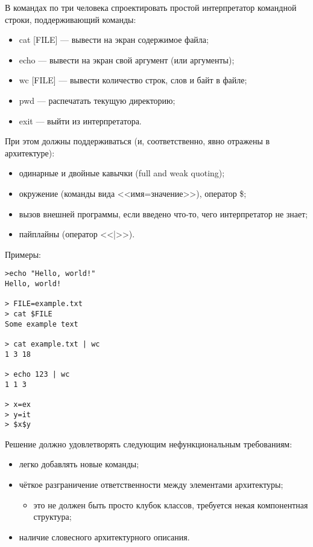 \documentclass[a5paper]{homework}
\begin{document}

В командах по три человека спроектировать простой интерпретатор командной строки, поддерживающий команды:

\begin{itemize}
    \item cat [FILE] --- вывести на экран содержимое файла;
    \item echo --- вывести на экран свой аргумент (или аргументы);
    \item wc [FILE] --- вывести количество строк, слов и байт в файле;
    \item pwd --- распечатать текущую директорию;
    \item exit --- выйти из интерпретатора.
\end{itemize}

При этом должны поддерживаться (и, соответственно, явно отражены в архитектуре):

\begin{itemize}
    \item одинарные и двойные кавычки (full and weak quoting);
    \item окружение (команды вида <<имя=значение>>), оператор \$;
    \item вызов внешней программы, если введено что-то, чего интерпретатор не знает;
    \item пайплайны (оператор <<|>>).
\end{itemize}

Примеры:
\begin{verbatim}
>echo "Hello, world!"
Hello, world!

> FILE=example.txt
> cat $FILE
Some example text

> cat example.txt | wc
1 3 18

> echo 123 | wc
1 1 3

> x=ex
> y=it
> $x$y
\end{verbatim}

Решение должно удовлетворять следующим нефункциональным требованиям:

\begin{itemize}
    \item легко добавлять новые команды;
    \item чёткое разграничение ответственности между элементами архитектуры;
    \begin{itemize}
        \item это не должен быть просто клубок классов, требуется некая компонентная структура;
    \end{itemize} 
    \item наличие словесного архитектурного описания.
\end{itemize}
\end{document}
